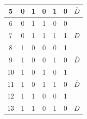 \begin{center}
\begin{tabular}{ccccccc}
\multicolumn{1}{c|}{5}                           & 0                         & 1                         & 0                         & \multicolumn{1}{c|}{1}                         & \multicolumn{1}{c|}{0}                             & \multirow{-2}{*}{$\overline{D}$} \\ \hline
\multicolumn{1}{c|}{6}                           & 0                         & 1                         & 1                         & \multicolumn{1}{c|}{0}                         & \multicolumn{1}{c|}{0}                             &                                  \\
\multicolumn{1}{c|}{7}                           & 0                         & 1                         & 1                         & \multicolumn{1}{c|}{1}                         & \multicolumn{1}{c|}{1}                             & \multirow{-2}{*}{$D$}            \\ \hline
\multicolumn{1}{c|}{8}                           & 1                         & 0                         & 0                         & \multicolumn{1}{c|}{0}                         & \multicolumn{1}{c|}{1}                             &                                  \\
\multicolumn{1}{c|}{9}                           & 1                         & 0                         & 0                         & \multicolumn{1}{c|}{1}                         & \multicolumn{1}{c|}{0}                             & \multirow{-2}{*}{$\overline{D}$} \\ \hline
\multicolumn{1}{c|}{10}                          & 1                         & 0                         & 1                         & \multicolumn{1}{c|}{0}                         & \multicolumn{1}{c|}{1}                             &                                  \\
\multicolumn{1}{c|}{11}                          & 1                         & 0                         & 1                         & \multicolumn{1}{c|}{1}                         & \multicolumn{1}{c|}{0}                             & \multirow{-2}{*}{$\overline{D}$} \\ \hline
\multicolumn{1}{c|}{12}                          & 1                         & 1                         & 0                         & \multicolumn{1}{c|}{0}                         & \multicolumn{1}{c|}{1}                             &                                  \\
\multicolumn{1}{c|}{13}                          & 1                         & 1                         & 0                         & \multicolumn{1}{c|}{1}                         & \multicolumn{1}{c|}{0}                             & \multirow{-2}{*}{$\overline{D}$} \\ \hline

\end{tabular}
\end{center}

